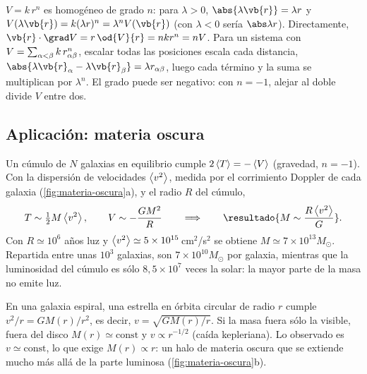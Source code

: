 \begin{observacion}
$V=k\,r^{n}$ es homogéneo de grado $n$: para $\lambda>0$, $\abs{\lambda\vb{r}}=\lambda r$ y
$V(\lambda\vb{r})=k(\lambda r)^{n}=\lambda^{n}V(\vb{r})$ (con $\lambda<0$ sería $\abs\lambda r$). Directamente,
$\vb{r}\cdot\grad V=r\,\od{V}{r}=nkr^{n}=nV$. Para un sistema con $V=\sum_{\alpha<\beta} k\,r_{\alpha\beta}^{n}$, escalar todas las
posiciones escala cada distancia, $\abs{\lambda\vb{r}_{\alpha}-\lambda\vb{r}_{\beta}}=\lambda r_{\alpha\beta}$, luego cada término y la
suma se multiplican por $\lambda^{n}$. El grado puede ser negativo: con $n=-1$, alejar al doble divide $V$ entre dos.
\end{observacion}

\subsection{Aplicación: materia oscura}

\begin{ejemplo}
\label{ej:zwicky}
Un cúmulo de $N$ galaxias en equilibrio cumple $2\left\langle T\right\rangle=-\left\langle V\right\rangle$ (gravedad, $n=-1$).
Con la dispersión de velocidades $\left\langle v^{2}\right\rangle$, medida por el corrimiento Doppler de
cada galaxia (\cref{fig:materia-oscura}a), y el radio $R$ del cúmulo,
\[
  T\sim\tfrac12M\prom{v^{2}},\qquad V\sim-\frac{GM^{2}}{R}
  \qquad\Longrightarrow\qquad
  \resultado{M\sim\frac{R\prom{v^{2}}}{G}} .
\]
Con $R\simeq10^{6}$ años luz y $\left\langle v^{2}\right\rangle\simeq5\times10^{15}$\,cm$^{2}$/s$^{2}$ se obtiene
$M\simeq7\times10^{13}M_{\odot}$. Repartida entre unas $10^{3}$ galaxias, son $7\times10^{10}M_{\odot}$
por galaxia, mientras que la luminosidad del cúmulo es sólo $8{,}5\times10^{7}$ veces la solar:
la mayor parte de la masa no emite luz.
\end{ejemplo}

\begin{observacion}
En una galaxia espiral, una estrella en órbita circular de radio $r$ cumple
$v^{2}/r=GM(r)/r^{2}$, es decir, $v=\sqrt{GM(r)/r}$. Si la masa fuera sólo la visible,
fuera del disco $M(r)\simeq\text{const}$ y $v\propto r^{-1/2}$ (caída kepleriana). Lo observado
es $v\simeq\text{const}$, lo que exige $M(r)\propto r$: un halo de materia oscura que
se extiende mucho más allá de la parte luminosa (\cref{fig:materia-oscura}b).
\end{observacion}

